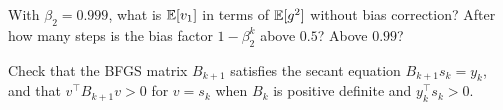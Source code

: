 \begin{notechapter}
\begin{exercise}\label{optimizers:exr:4}
With $\beta_2 = 0.999$, what is $\mathbb{E}[v_1]$ in terms of $\mathbb{E}[g^2]$ without bias correction? After how many steps is the
bias factor $1 - \beta_2^k$ above $0.5$? Above $0.99$?
\end{exercise}

\begin{exercise}\label{optimizers:exr:5}
Check that the BFGS matrix $B_{k+1}$ satisfies the secant equation $B_{k+1}s_k = y_k$, and that
$v^\top B_{k+1}v>0$ for $v = s_k$ when $B_k$ is positive definite and $y_k^\top s_k>0$.
\end{exercise}
\end{notechapter}
